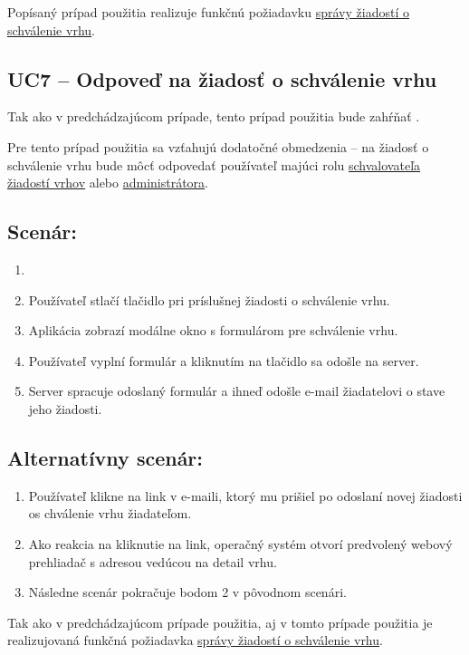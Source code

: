 Popísaný prípad použitia realizuje funkčnú požiadavku \hyperref[sprava-ziadosti-o-schvalenie-vrhu]{správy žiadostí o schválenie vrhu}.

\subsection*{UC7 -- Odpoveď na žiadosť o schválenie vrhu}

Tak ako v predchádzajúcom prípade, tento prípad použitia bude zahŕňať .

Pre tento prípad použitia sa vzťahujú dodatočné obmedzenia -- na žiadosť o schválenie vrhu bude môcť odpovedať používateľ majúci rolu \hyperref[schvalovatel-vrhov]{schvalovateľa žiadostí vrhov} alebo \hyperref[administrator]{administrátora}.

\subsection*{Scenár:}

\begin{enumerate}
	\item {}
	\item Používateľ stlačí tlačidlo  pri príslušnej žiadosti o schválenie vrhu.
	\item Aplikácia zobrazí modálne okno s formulárom pre schválenie vrhu.
	\item Používateľ vyplní formulár a kliknutím na tlačidlo  sa odošle na server.
	\item Server spracuje odoslaný formulár a ihneď odošle e-mail žiadatelovi o stave jeho žiadosti.
\end{enumerate}

\subsection*{Alternatívny scenár:}

\begin{enumerate}
	\item Používateľ klikne na link v e-maili, ktorý mu prišiel po odoslaní novej žiadosti os chválenie vrhu žiadateľom.
	\item Ako reakcia na kliknutie na link, operačný systém otvorí predvolený webový prehliadač s adresou vedúcou na detail vrhu.
	\item Následne scenár pokračuje bodom 2 v pôvodnom scenári.
\end{enumerate}

Tak ako v predchádzajúcom prípade použitia, aj v tomto prípade použitia je realizujovaná funkčná požiadavka \hyperref[sprava-ziadosti-o-schvalenie-vrhu]{správy žiadostí o schválenie vrhu}.









